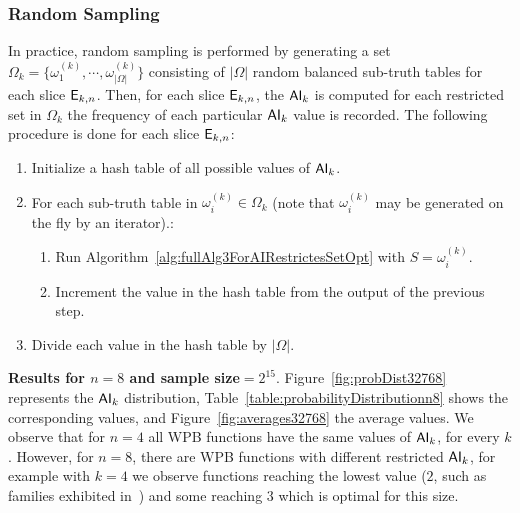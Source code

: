 \documentclass[11pt]{llncs}
\begin{document}
\subsubsection{Random Sampling}
In practice, random sampling is performed by generating a set $\Omega_k = \{\omega_1^{(k)}, \cdots, \omega_{|\Omega|}^{(k)}\}$ consisting of $|\Omega|$ random balanced sub-truth tables for each slice $\mathsf{E}_{k,n}$. 
Then, for each slice $\mathsf{E}_{k,n}$, the $\mathsf{AI}_{k}$ is computed for each restricted set in $\Omega_k$ the frequency of each particular $\mathsf{AI}_{k}$ value is recorded.
The following procedure is done for each slice $\mathsf{E}_{k,n}$:
\begin{enumerate}
    \item Initialize a hash table of all possible values of $\mathsf{AI}_{k}$.
    \item For each sub-truth table in $\omega_i^{(k)} \in \Omega_k$ (note that $\omega_i^{(k)}$ may be generated on the fly by an iterator).\footnotemark:
    \begin{enumerate}
        \item Run Algorithm~\ref{alg:fullAlg3ForAIRestrictesSetOpt} with $S=\omega_i^{(k)}$\label{enum:stepOfapplicationEnum}.
        \item Increment the value in the hash table from the output of the previous step.
    \end{enumerate}
    \item Divide each value in the hash table by $|\Omega|$.
\end{enumerate}

\noindent
\textbf{Results for $n=8$ and sample size$=2^{15}$}.
Figure~\ref{fig:probDist32768} represents the $\mathsf{AI}_{k}$ distribution, Table~\ref{table:probabilityDistributionn8} shows the corresponding values, and Figure~\ref{fig:averages32768} the average values.
We observe that for $n=4$ all WPB functions have the same values of $\mathsf{AI}_{k}$, for every $k$. 
However, for $n=8$, there are WPB functions with different restricted $\mathsf{AI}_{k}$, for example with $k=4$ we observe functions reaching the lowest value ($2$, such as families exhibited in~\cite{Latin:GinMea23}) and some reaching $3$ which is optimal for this size.
\end{document}
